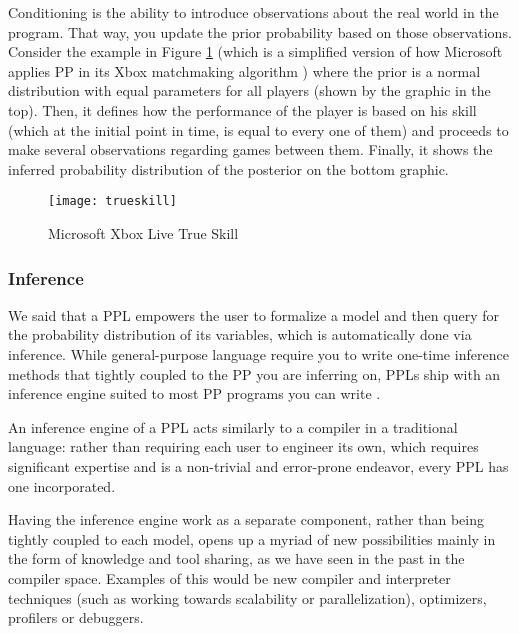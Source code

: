 Conditioning is the ability to introduce observations about the real world in
the program. That way, you update the prior probability based
on those observations. Consider the example in Figure \ref{fig:truskill} (which
is a simplified version of how Microsoft applies PP in its Xbox matchmaking
algorithm \cite{minka2012infer}) where the prior is a normal distribution with
equal parameters for all players (shown by the graphic in the top). Then, it
defines how the performance of the player is based on his skill (which at the initial
point in time, is equal to every one of them) and proceeds to make several
observations regarding games between them. Finally, it shows the inferred
probability distribution of the posterior on the bottom graphic.

\begin{figure}[t]
  \begin{center}
    \leavevmode
    \texttt{[image: trueskill]}
    \caption{Microsoft Xbox Live True Skill \cite{minka2012infer}}
    \label{fig:truskill}
  \end{center}
\end{figure}

\subsubsection{Inference}

We said that a PPL empowers the user to formalize a model and then query for the
probability distribution of its variables, which is automatically done via
inference. While general-purpose language require you to write one-time
inference methods that tightly coupled to the PP you are inferring on, PPLs
ship with an inference engine suited to most PP programs you can write
\cite{Freer2010}.

An inference engine of a PPL acts similarly to a compiler in a traditional
language: rather than requiring each user to engineer its own, which requires
significant expertise and is a non-trivial and error-prone endeavor, every PPL
has one incorporated.

Having the inference engine work as a separate component, rather than being
tightly coupled to each model, opens up a myriad of new
possibilities mainly in the form of knowledge and tool sharing, as we have
seen in the past in the compiler space. Examples of this would be new
compiler and interpreter techniques (such as working towards scalability or
parallelization), optimizers, profilers or debuggers.

